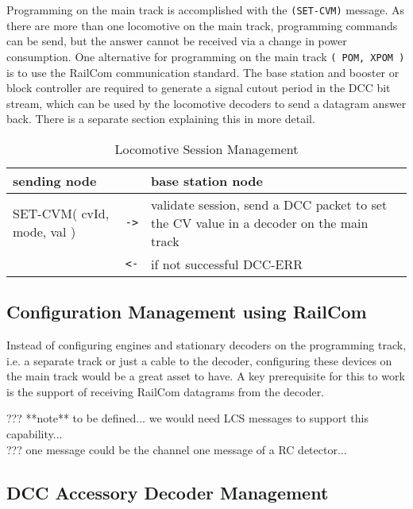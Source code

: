 Programming on the main track is accomplished with the \texttt{(SET-CVM)} message. As there are more than one locomotive on the main track, programming commands can be send, but the answer cannot be received via a change in power consumption. One alternative for programming on the main track \texttt{( POM, XPOM )} is to use the RailCom communication standard. The base station and booster or block controller are required to generate a signal cutout period in the DCC bit stream, which can be used by the locomotive decoders to send a datagram answer back. There is a separate section explaining this in more detail.

\begin{table}[ht!]
    \begin{center}
        \caption{Locomotive Session Management}
        \begin{tabular}{|p{}| c |p{}|}
            \toprule
            \textbf{sending node} & & \textbf{ base station node} \\
            \midrule
            SET-CVM( cvId, mode, val ) & \texttt{->} & validate session, send a DCC packet to set the CV value in a decoder on the main track \\
            & \texttt{<-} & if not successful DCC-ERR \\
            \bottomrule
        \end{tabular}
    \end{center}
\end{table}

\subsection{Configuration Management using RailCom}

Instead of configuring engines and stationary decoders on the programming track, i.e. a separate track or just a cable to the decoder, configuring  these devices on the main track would be a great asset to have. A key prerequisite for this to work is the support of receiving RailCom datagrams from the decoder.

??? **note** to be defined... we would need LCS messages to support this capability... \\
??? one message could be the channel one message of a RC detector...

\subsection{DCC Accessory Decoder Management}

